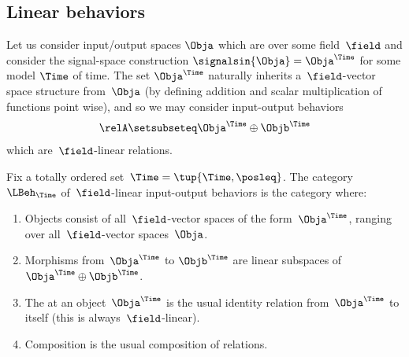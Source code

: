 



\subsection{Linear behaviors}

Let us consider input/output spaces $\Obja$ which are  over some field~$\field$ and consider the signal-space construction $\signalsin{\Obja} = \Obja^\Time$ for some model $\Time$ of time.
The set $\Obja^\Time$ naturally inherits a~$\field$-vector space structure from~$\Obja$ (by defining addition and scalar multiplication of functions point wise), and so we may consider input-output behaviors
\begin{equation}
    \relA \setsubseteq \Obja^\Time \oplus \Objb^\Time
\end{equation}
which are~$\field$-linear relations.

\begin{definition}\label{def:linear-io-behavior}
    Fix a totally ordered set~$\Time = \tup{\Time, {\posleq}}$.
    The category~$\LBeh_\Time$ of~$\field$-linear input-output behaviors is the category where:
    \begin{enumerate}
        \item Objects consist of all~$\field$-vector spaces of the form~$\Obja^\Time$, ranging over all~$\field$-vector spaces~$\Obja$.
        \item Morphisms from~$\Obja^\Time$ to $\Objb^\Time$ are linear subspaces of~$\Obja^\Time \oplus \Objb^\Time$.
        \item The  at an object~$\Obja^\Time$ is the usual identity relation from~$\Obja^\Time$ to itself (this is always~$\field$-linear).
        \item Composition is the usual composition of relations.
    \end{enumerate}
\end{definition}


